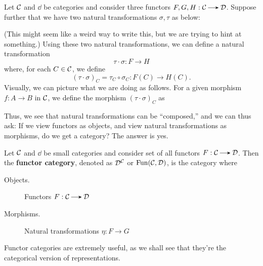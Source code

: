     Let $\mathcal{C}$ and $\dd$ be categories and consider three functors
    $F, G, H: \cc \to \dd$.
    Suppose further that we have two natural transformations $\sigma, \tau$ as below:
    \begin{center}
    \end{center}
    (This might seem like a weird way to write this, but we are trying to hint at something.)
    Using these two natural transformations,
    we can define a natural transformation 
    \[
        \tau \cdot \sigma: F \to H
    \]
    where, for each $C \in \mathcal{C}$, we define 
    \[
        (\tau \cdot \sigma)_C = \tau_C \circ \sigma_C: F(C) \to H(C).
    \]
    Visually, we can picture what we are doing as follows.
    For a given morphism $f: A \to B$ in $\mathcal{C}$,
    we define the morphism $(\tau \cdot \sigma)_C$ as
    \begin{center}
    \end{center}
    Thus, we see that natural transformations can be ``composed,''
    and we can thus ask: If we view functors as objects, and view natural transformations 
    as morphisms, do we get a category? The answer is yes. 

    \begin{definition}
        Let $\mathcal{C}$ and $\dd$ be small categories and consider set of
        all functors $F: \cc \to \dd$. Then the \textbf{functor
        category}, denoted as $\mathcal{D}^{\mathcal{C}}$ or $\operatorname{\mathrm{Fun}}(\mathcal{C}, \mathcal{D})$, is the
        category where 
        \begin{description}
            \item[Objects.] Functors $F: \cc \to \dd$
            \item[Morphisms.] Natural transformations $\eta: F \to G$   
        \end{description}
    \end{definition}
    Functor categories are extremely useful, as we shall see that 
    they're the categorical version of representations. 
    
